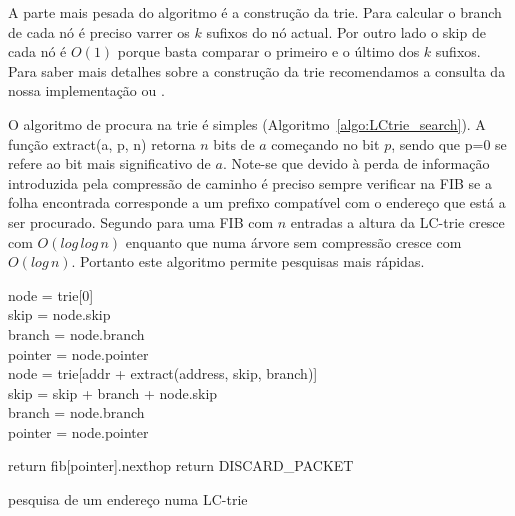 \documentclass[10pt,a4paper]{article}
\begin{document}
A parte mais pesada do algoritmo é a construção da trie. Para calcular o branch de cada nó é preciso varrer os $k$ sufixos do nó actual. Por outro lado o skip de cada nó é $O(1)$ porque basta comparar o primeiro e o último dos $k$ sufixos. Para saber mais detalhes sobre a construção da trie recomendamos a consulta da nossa implementação ou \cite{SNilsson99}.

O algoritmo de procura na trie é simples (Algoritmo~\ref{algo:LCtrie_search}). A função extract(a, p, n) retorna $n$ bits de $a$ começando no bit $p$, sendo que p=0 se refere ao bit mais significativo de $a$. Note-se que devido à perda de informação introduzida pela compressão de caminho é preciso sempre verificar na FIB se a folha encontrada corresponde a um prefixo compatível com o endereço que está a ser procurado. Segundo \cite{SNilsson99} para uma FIB com $n$ entradas a altura da \mbox{LC-trie} cresce com $O(log \, log \, n)$ enquanto que numa árvore sem compressão cresce com $O(log \, n)$. Portanto este algoritmo permite pesquisas mais rápidas.

\begin{algorithm}
	\label{algo:LCtrie_search}

	node = trie[0] \\
	skip = node.skip \\
	branch = node.branch \\
	pointer = node.pointer \\
	{
		node = trie[addr + extract(address, skip, branch)] \\
		skip = skip + branch + node.skip \\
		branch = node.branch \\
		pointer = node.pointer \\
	}
	
	{
		return fib[pointer].nexthop
	}
	\Else
	{
		return DISCARD\_PACKET
	}

		\begin{comment}
			node = trie[0]
			skip = node.skip
			branch = node.branch
			pointer = node.pointer
			
			while( branch != 0 )
			{
				node = trie[addr + extract(address, skip, branch)]
				skip = skip + branch + node.skip
				branch = node.branch
				pointer = node.pointer
			}
			
			if( address starts with fib[pointer].prefix )
				return fib[pointer].nexthop
			else
				return DISCARD_PACKET \\
		\end{comment}
	\caption{pesquisa de um endereço numa LC-trie}
\end{algorithm}
\end{document}
